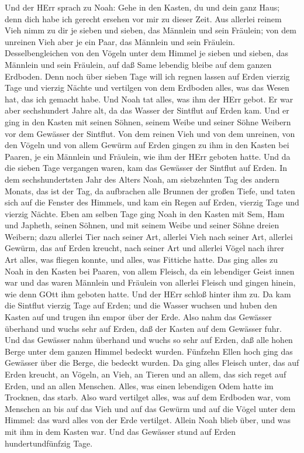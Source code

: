  Und der HErr sprach zu Noah: Gehe in den Kasten, du und
dein ganz Haus; denn dich habe ich gerecht ersehen vor mir zu dieser
Zeit.  Aus allerlei reinem Vieh nimm zu dir je sieben und
sieben, das Männlein und sein Fräulein; von dem unreinen Vieh aber je
ein Paar, das Männlein und sein Fräulein.  Desselbengleichen
von den Vögeln unter dem Himmel je sieben und sieben, das Männlein und
sein Fräulein, auf daß Same lebendig bleibe auf dem ganzen Erdboden.
 Denn noch über sieben Tage will ich regnen lassen auf Erden
vierzig Tage und vierzig Nächte und vertilgen von dem Erdboden alles,
was das Wesen hat, das ich gemacht habe.  Und Noah tat
alles, was ihm der HErr gebot.  Er war aber sechshundert
Jahre alt, da das Wasser der Sintflut auf Erden kam.  Und er
ging in den Kasten mit seinen Söhnen, seinem Weibe und seiner Söhne
Weibern vor dem Gewässer der Sintflut.  Von dem reinen Vieh
und von dem unreinen, von den Vögeln und von allem Gewürm auf Erden
 gingen zu ihm in den Kasten bei Paaren, je ein Männlein und
Fräulein, wie ihm der HErr geboten hatte.  Und da die
sieben Tage vergangen waren, kam das Gewässer der Sintflut auf Erden.
 In dem sechshundertsten Jahr des Alters Noah, am
siebzehnten Tag des andern Monats, das ist der Tag, da aufbrachen alle
Brunnen der großen Tiefe, und taten sich auf die Fenster des Himmels,
 und kam ein Regen auf Erden, vierzig Tage und vierzig
Nächte.  Eben am selben Tage ging Noah in den Kasten mit
Sem, Ham und Japheth, seinen Söhnen, und mit seinem Weibe und seiner
Söhne dreien Weibern;  dazu allerlei Tier nach seiner Art,
allerlei Vieh nach seiner Art, allerlei Gewürm, das auf Erden kreucht,
nach seiner Art und allerlei Vögel nach ihrer Art alles, was fliegen
konnte, und alles, was Fittiche hatte.  Das ging alles zu
Noah in den Kasten bei Paaren, von allem Fleisch, da ein lebendiger
Geist innen war  und das waren Männlein und Fräulein von
allerlei Fleisch und gingen hinein, wie denn GOtt ihm geboten hatte. Und
der HErr schloß hinter ihm zu.  Da kam die Sintflut vierzig
Tage auf Erden; und die Wasser wuchsen und huben den Kasten auf und
trugen ihn empor über der Erde.  Also nahm das Gewässer
überhand und wuchs sehr auf Erden, daß der Kasten auf dem Gewässer fuhr.
 Und das Gewässer nahm überhand und wuchs so sehr auf
Erden, daß alle hohen Berge unter dem ganzen Himmel bedeckt wurden.
 Fünfzehn Ellen hoch ging das Gewässer über die Berge, die
bedeckt wurden.  Da ging alles Fleisch unter, das auf Erden
kreucht, an Vögeln, an Vieh, an Tieren und an allem, das sich reget auf
Erden, und an allen Menschen.  Alles, was einen lebendigen
Odem hatte im Trocknen, das starb.  Also ward vertilget
alles, was auf dem Erdboden war, vom Menschen an bis auf das Vieh und
auf das Gewürm und auf die Vögel unter dem Himmel: das ward alles von
der Erde vertilget. Allein Noah blieb über, und was mit ihm in dem
Kasten war.  Und das Gewässer stund auf Erden
hundertundfünfzig Tage.

